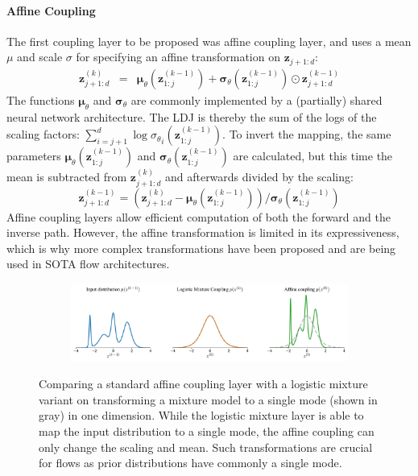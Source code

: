 \paragraph{Affine Coupling} The first coupling layer to be proposed was affine coupling layer, and uses a mean $\mu$ and scale $\sigma$ for specifying an affine transformation on $\bm{z}_{j+1:d}$:
\begin{eqnarray}
	\label{eqn:background_affine_coupling}
	\bm{z}^{(k)}_{j+1:d} & = & \bm{\mu}_{\theta}(\bm{z}^{(k-1)}_{1:j}) +  \bm{\sigma}_{\theta}(\bm{z}^{(k-1)}_{1:j}) \odot \bm{z}^{(k-1)}_{j+1:d}
\end{eqnarray}
The functions $\bm{\mu}_{\theta}$ and $\bm{\sigma}_{\theta}$ are commonly implemented by a (partially) shared neural network architecture. The \ac{LDJ} is thereby the sum of the logs of the scaling factors: $\sum_{i=j+1}^{d} \log {\sigma_{\theta}}_i(\bm{z}^{(k-1)}_{1:j})$.
To invert the mapping, the same parameters $\bm{\mu}_{\theta}(\bm{z}^{(k-1)}_{1:j})$ and $\bm{\sigma}_{\theta}(\bm{z}^{(k-1)}_{1:j})$ are calculated, but this time the mean is subtracted from $\bm{z}^{(k)}_{j+1:d}$ and afterwards divided by the scaling:
\begin{equation}
	\bm{z}^{(k-1)}_{j+1:d} = \left(\bm{z}^{(k)}_{j+1:d} - \bm{\mu}_{\theta}(\bm{z}^{(k-1)}_{1:j})\right) / \bm{\sigma}_{\theta}(\bm{z}^{(k-1)}_{1:j})
\end{equation}
Affine coupling layers allow efficient computation of both the forward and the inverse path.
However, the affine transformation is limited in its expressiveness, which is why more complex transformations have been proposed and are being used in \acl{SOTA} flow architectures.

\begin{figure}[t!]
    \centering
    \begin{subfigure}{\textwidth}
        \centering
        \includegraphics[width=\linewidth]{figures/flow_layer_figures/MoL_logistic_prior_font.pdf}
    \end{subfigure}
    \caption[Comparing affine and logistic mixture coupling layer on single dimension]{Comparing a standard affine coupling layer with a logistic mixture variant on transforming a mixture model to a single mode (shown in gray) in one dimension. While the logistic mixture layer is able to map the input distribution to a single mode, the affine coupling can only change the scaling and mean. Such transformations are crucial for flows as prior distributions have commonly a single mode.}
    \label{sec:background_comparing_coupling_layers}
\end{figure}

